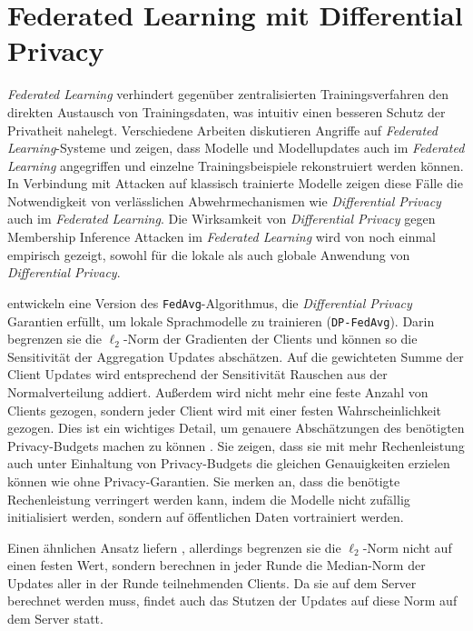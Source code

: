 \section{Federated Learning mit Differential Privacy}\label{sec:rw-fldp}
\textit{Federated Learning} verhindert gegenüber zentralisierten Trainingsverfahren den direkten Austausch von Trainingsdaten, was intuitiv einen besseren Schutz der Privatheit nahelegt. Verschiedene Arbeiten \cite{wang:2019, geiping:2020, ma:2020} diskutieren Angriffe auf \textit{Federated Learning}-Systeme und zeigen, dass Modelle und Modellupdates auch im \textit{Federated Learning} angegriffen und einzelne Trainingsbeispiele rekonstruiert werden können. In Verbindung mit Attacken auf klassisch trainierte Modelle zeigen diese Fälle die Notwendigkeit von verlässlichen Abwehrmechanismen wie \textit{Differential Privacy} auch im \textit{Federated Learning}. Die Wirksamkeit von \textit{Differential Privacy} gegen Membership Inference Attacken im \textit{Federated Learning} wird von \textcite{naseri:2022} noch einmal empirisch gezeigt, sowohl für die lokale als auch globale Anwendung von \textit{Differential Privacy}.

\textcite{mcmahan:2018} entwickeln eine Version des \texttt{FedAvg}-Algorithmus, die \textit{Differential Privacy} Garantien erfüllt, um lokale Sprachmodelle zu trainieren (\texttt{DP-FedAvg}). Darin begrenzen sie die $\ell_2$-Norm der Gradienten der Clients und können so die Sensitivität der Aggregation Updates abschätzen. Auf die gewichteten Summe der Client Updates wird entsprechend der Sensitivität Rauschen aus der Normalverteilung addiert. Außerdem wird nicht mehr eine feste Anzahl von Clients gezogen, sondern jeder Client wird mit einer festen Wahrscheinlichkeit gezogen. Dies ist ein wichtiges Detail, um genauere Abschätzungen des benötigten Privacy-Budgets machen zu können \cite{wang:2020}. Sie zeigen, dass sie mit mehr Rechenleistung auch unter Einhaltung von Privacy-Budgets die gleichen Genauigkeiten erzielen können wie ohne Privacy-Garantien. Sie merken an, dass die benötigte Rechenleistung verringert werden kann, indem die Modelle nicht zufällig initialisiert werden, sondern auf öffentlichen Daten vortrainiert werden.

Einen ähnlichen Ansatz liefern \textcite{geyer:2017}, allerdings begrenzen sie die $\ell_2$-Norm nicht auf einen festen Wert, sondern berechnen in jeder Runde die Median-Norm der Updates aller in der Runde teilnehmenden Clients. Da sie auf dem Server berechnet werden muss, findet auch das Stutzen der Updates auf diese Norm auf dem Server statt. 

